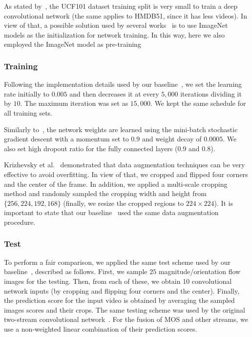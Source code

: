 \documentclass[10pt,conference]{IEEEtran}
\begin{document}
As stated by~\cite{Wang:2015}, the UCF101 dataset training split is very small to train a deep convolutional network (the same applies to HMDB51, since it has less videos). In view of that, a possible solution used by several works~\cite{Simonyan:2014, Wang:2015, Feichtenhofer:2016, Wang:2016} is to use
ImageNet models as the initialization for network training. In this way, here we also employed the ImageNet model as pre-training

\subsubsection{Training} 

Following the implementation details used by our baseline~\cite{Wang:2015}, we set the learning rate initially to $0.005$ and then decreases it at every $5,000$ iterations dividing it by $10$. The maximum iteration was set as $15,000$.
We kept the same schedule for all training sets. %

Similarly to~\cite{Simonyan:2014, Wang:2015}, the network weights are learned using the mini-batch stochastic gradient descent with a momentum set to $0.9$ and weight decay of $0.0005$. We also set high dropout ratio for the fully connected layers ($0.9$ and $0.8$).

Krizhevsky et al.~\cite{Krizhevsky:2012} demonstrated that data augmentation techniques can be very effective to avoid overfitting. In view of that, we cropped and flipped four corners and the center of the frame. In addition, we applied a multi-scale cropping method and randomly sampled the cropping width and height from $\{256, 224, 192, 168\}$ (finally, we resize the cropped regions to $224 \times 224$). It is important to state that our baseline~\cite{Wang:2015} used the same data augmentation procedure.

\subsubsection{Test} 

To perform a fair comparison, we applied the same test scheme used by our baseline~\cite{Wang:2015}, described as follows. First, we sample $25$ magnitude/orientation flow images for the testing. Then, from each of these, we obtain 10 convolutional network inputs (by cropping and flipping four corners and the center). Finally, the prediction score for the input video is obtained by averaging the sampled images scores and their crops. The same testing scheme was used by the original two-stream convolutional network~\cite{Simonyan:2014}. For the fusion of MOS and other streams, we use a non-weighted linear combination of their prediction scores.
\end{document}
